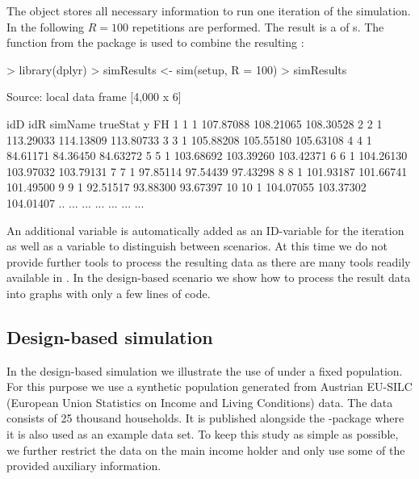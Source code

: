 \documentclass[article]{ajs}
\begin{document}
The object  stores all necessary information to run one iteration of the simulation. In the following $R = 100$ repetitions are performed. The result is a  of s. The function  from the package  is used to combine the resulting :

\begin{Schunk}
\begin{Sinput}
> library(dplyr)
> simResults <- sim(setup, R = 100) %
> simResults %
\end{Sinput}
\begin{Soutput}
Source: local data frame [4,000 x 6]

   idD idR simName  trueStat         y        FH
1    1   1         107.87088 108.21065 108.30528
2    2   1         113.29033 114.13809 113.80733
3    3   1         105.88208 105.55180 105.63108
4    4   1          84.61171  84.36450  84.63272
5    5   1         103.68692 103.39260 103.42371
6    6   1         104.26130 103.97032 103.79131
7    7   1          97.85114  97.54439  97.43298
8    8   1         101.93187 101.66741 101.49500
9    9   1          92.51517  93.88300  93.67397
10  10   1         104.07055 103.37302 104.01407
.. ... ...     ...       ...       ...       ...
\end{Soutput}
\end{Schunk}

An additional variable  is automatically added as an ID-variable for the iteration as well as a variable  to distinguish between scenarios. At this time we do not provide further tools to process the resulting data as there are many tools readily available in . In the design-based scenario we show how to process the result data into graphs with only a few lines of code.

\subsection{Design-based simulation}
\label{sec:csDesign}

In the design-based simulation we illustrate the use of  under a fixed population. For this purpose we use a synthetic population generated from Austrian EU-SILC (European Union Statistics on Income and Living Conditions) data. The data consists of 25 thousand households. It is published alongside the -package  \citep{Alf10} where it is also used as an example data set. To keep this study as simple as possible, we further restrict the data on the main income holder and only use some of the provided auxiliary information.
\end{document}

